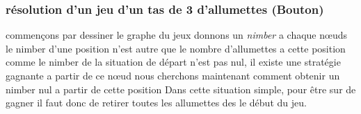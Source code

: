 \documentclass{beamer}
\begin{document}
  \begin{frame}
    \frametitle{résolution d'un jeu d'un tas de 3 d'allumettes (Bouton)}
     {commençons par dessiner le graphe du jeux}
     {donnons un \textit{nimber} a chaque nœuds}
     {\alert{le nimber d'une position n'est autre que le nombre d'allumettes a cette position}}
     {comme le nimber de la situation de départ n'est pas nul, il existe une stratégie gagnante a partir de ce nœud}
     {nous cherchons maintenant comment obtenir un nimber nul a partir de cette position}
     {Dans cette situation simple, pour être sur de gagner il faut donc de retirer toutes les allumettes des le début du jeu.}

     {
      \begin{figure}[h]
        \centering
      \end{figure}
    }
  \end{frame}
\end{document}

